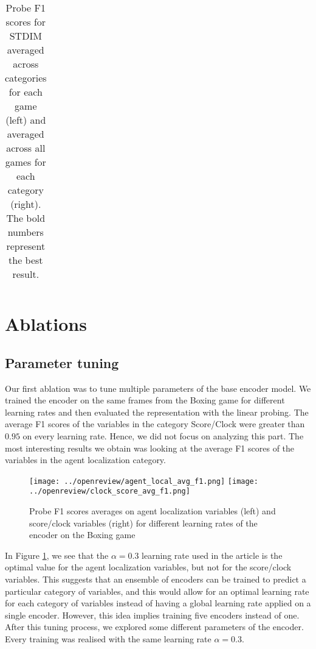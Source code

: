 \begin{table}[H]
{\begin{tabular}{ll}
\end{tabular}%
}
\caption{Probe F1 scores for STDIM averaged across categories for each game (left) and averaged across all games for each category (right). The bold numbers represent the best result.}
\label{tab:reprod}
\end{table}

\section{Ablations}
\subsection{Parameter tuning}
Our first ablation was to tune multiple parameters of the base encoder model. We trained the encoder on the same frames from the Boxing game for different learning rates and then evaluated the representation with the linear probing. The average F1 scores of the variables in the category Score/Clock were greater than $0.95$ on every learning rate. Hence, we did not focus on analyzing this part. The most interesting results we obtain was looking at the average F1 scores of the variables in the agent localization category. 

\begin{figure}[H]
    \centering
    \texttt{[image: ../openreview/agent\_local\_avg\_f1.png]}
    \texttt{[image: ../openreview/clock\_score\_avg\_f1.png]}
    \caption{Probe F1 scores averages on agent localization variables (left) and score/clock variables (right) for different learning rates of the encoder on the Boxing game}
    \label{fig:agent_local_avg_f1}
\end{figure}

In Figure \ref{fig:agent_local_avg_f1}, we see that the $\alpha=0.3$ learning rate used in the article is the optimal value for the agent localization variables, but not for the score/clock variables. This suggests that an ensemble of encoders can be trained to predict a particular category of variables, and this would allow for an optimal learning rate for each category of variables instead of having a global learning rate applied on a single encoder. However, this idea implies training five encoders instead of one.\\

After this tuning process, we explored some different parameters of the encoder. Every training was realised with the same learning rate $\alpha=0.3$. \\

